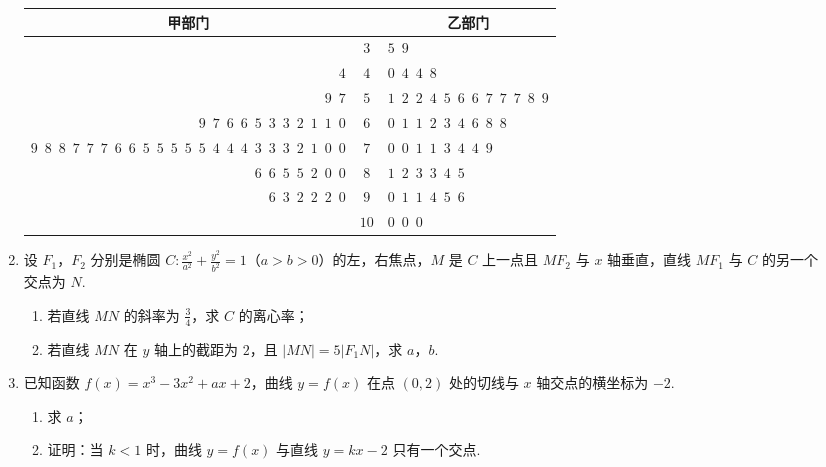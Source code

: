 \begin{description}
\begin{enumerate}[leftmargin=5pt]
\begin{center}
\renewcommand{\arraystretch}{1.3}
\begin{tabular}{r|c|l}
\multicolumn{1}{c|}{甲部门} & \multicolumn{1}{c|}{} & \multicolumn{1}{c}{乙部门} \\
\hline
 & \(3\) & \(5\enspace 9\) \\
\(4\) & \(4\) & \(0\enspace 4\enspace 4\enspace 8\) \\
\(9\enspace 7\) & \(5\) & \(1\enspace 2\enspace 2\enspace 4\enspace 5\enspace 6\enspace 6\enspace 7\enspace 7\enspace 7\enspace 8\enspace 9\) \\
\(9\enspace 7\enspace 6\enspace 6\enspace 5\enspace 3\enspace 3\enspace 2\enspace 1\enspace 1\enspace 0\) & \(6\) & \(0\enspace 1\enspace 1\enspace 2\enspace 3\enspace 4\enspace 6\enspace 8\enspace 8\) \\
\(9\enspace 8\enspace 8\enspace 7\enspace 7\enspace 7\enspace 6\enspace 6\enspace 5\enspace 5\enspace 5\enspace 5\enspace 5\enspace 4\enspace 4\enspace 4\enspace 3\enspace 3\enspace 3\enspace 2\enspace 1\enspace 0\enspace 0\) & \(7\) & \(0\enspace 0\enspace 1\enspace 1\enspace 3\enspace 4\enspace 4\enspace 9\) \\
\(6\enspace 6\enspace 5\enspace 5\enspace 2\enspace 0\enspace 0\) & \(8\) & \(1\enspace 2\enspace 3\enspace 3\enspace 4\enspace 5\) \\
\(6\enspace 3\enspace 2\enspace 2\enspace 2\enspace 0\) & \(9\) & \(0\enspace 1\enspace 1\enspace 4\enspace 5\enspace 6\) \\
 & \(10\) & \(0\enspace 0\enspace 0\)
\end{tabular}
\end{center}

        \item 设 \(F_1\)，\(F_2\) 分别是椭圆 \(C:\frac{x^2}{a^2}+\frac{y^2}{b^2}=1\)（\(a>b>0\)）的左，右焦点，\(M\) 是 \(C\) 上一点且 \(MF_2\) 与 \(x\) 轴垂直，直线 \(MF_1\) 与 \(C\) 的另一个交点为 \(N\).
\begin{enumerate}
\item 若直线 \(MN\) 的斜率为 \(\frac{3}{4}\)，求 \(C\) 的离心率；
\item 若直线 \(MN\) 在 \(y\) 轴上的截距为 \(2\)，且 \(|MN|=5|F_1N|\)，求 \(a\)，\(b\).
\end{enumerate}

        \item 已知函数 \(f(x)=x^3-3x^2+ax+2\)，曲线 \(y=f(x)\) 在点 \((0,2)\) 处的切线与 \(x\) 轴交点的横坐标为 \(-2\).
\begin{enumerate}
\item 求 \(a\)；
\item 证明：当 \(k<1\) 时，曲线 \(y=f(x)\) 与直线 \(y=kx-2\) 只有一个交点.
\end{enumerate}


\end{enumerate}
\end{description}
